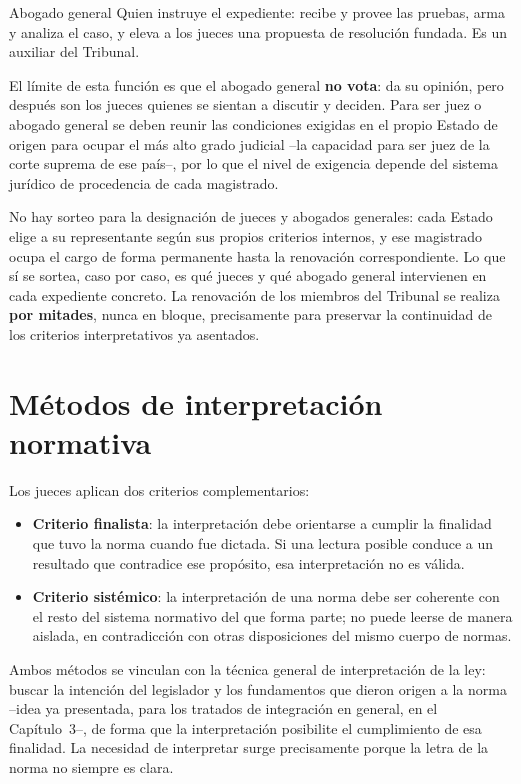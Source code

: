 \documentclass[12pt,oneside]{book}
\begin{document}
\begin{definicion}{Abogado general}
Quien instruye el expediente: recibe y provee las pruebas, arma y analiza el caso, y eleva a los jueces una propuesta de resolución fundada. Es un auxiliar del Tribunal.
\end{definicion}

El límite de esta función es que el abogado general \textbf{no vota}: da su opinión, pero después son los jueces quienes se sientan a discutir y deciden. Para ser juez o abogado general se deben reunir las condiciones exigidas en el propio Estado de origen para ocupar el más alto grado judicial --la capacidad para ser juez de la corte suprema de ese país--, por lo que el nivel de exigencia depende del sistema jurídico de procedencia de cada magistrado.

No hay sorteo para la designación de jueces y abogados generales: cada Estado elige a su representante según sus propios criterios internos, y ese magistrado ocupa el cargo de forma permanente hasta la renovación correspondiente. Lo que sí se sortea, caso por caso, es qué jueces y qué abogado general intervienen en cada expediente concreto. La renovación de los miembros del Tribunal se realiza \textbf{por mitades}, nunca en bloque, precisamente para preservar la continuidad de los criterios interpretativos ya asentados.

\section{Métodos de interpretación normativa}

Los jueces aplican dos criterios complementarios:

\begin{itemize}
    \item \textbf{Criterio finalista}: la interpretación debe orientarse a cumplir la finalidad que tuvo la norma cuando fue dictada. Si una lectura posible conduce a un resultado que contradice ese propósito, esa interpretación no es válida.
    \item \textbf{Criterio sistémico}: la interpretación de una norma debe ser coherente con el resto del sistema normativo del que forma parte; no puede leerse de manera aislada, en contradicción con otras disposiciones del mismo cuerpo de normas.
\end{itemize}

Ambos métodos se vinculan con la técnica general de interpretación de la ley: buscar la intención del legislador y los fundamentos que dieron origen a la norma --idea ya presentada, para los tratados de integración en general, en el Capítulo~3--, de forma que la interpretación posibilite el cumplimiento de esa finalidad. La necesidad de interpretar surge precisamente porque la letra de la norma no siempre es clara.
\end{document}

